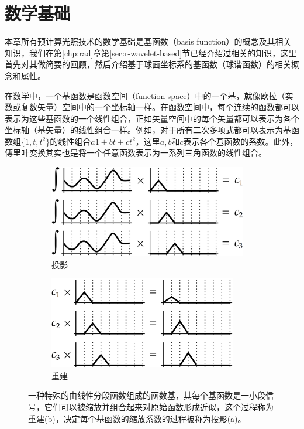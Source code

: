 \section{数学基础}\label{sec:pl-sh}
本章所有预计算光照技术的数学基础是基函数（basis function）的概念及其相关知识，我们在第\ref{chp:rad}章第\ref{sec:r-wavelet-based}节已经介绍过相关的知识，这里首先对其做简要的回顾，然后介绍基于球面坐标系的基函数（球谐函数）的相关概念和属性。

在数学中，一个基函数是函数空间（function space）中的一个基，就像欧拉（实数或复数矢量）空间中的一个坐标轴一样。在函数空间中，每个连续的函数都可以表示为这些基函数的一个线性组合，正如矢量空间中的每个矢量都可以表示为各个坐标轴（基矢量）的线性组合一样。例如，对于所有二次多项式都可以表示为基函数组$\{1,t,t^{2}\}$的线性组合$a1+bt+ct^{2}$，这里$a,b$和$c$表示各个基函数的系数。此外，傅里叶变换其实也是将一个任意函数表示为一系列三角函数的线性组合。

\begin{figure}
	\begin{subfigure}[b]{0.49\textwidth}
		\includegraphics[width=0.95\textwidth]{figures/prt/prt-1}
		\caption{投影}
	\end{subfigure}
		\begin{subfigure}[b]{0.49\textwidth}
		\includegraphics[width=0.9\textwidth]{figures/prt/prt-2}
			\caption{重建}
	\end{subfigure}
	\caption{一种特殊的由线性分段函数组成的函数基，其每个基函数是一小段信号，它们可以被缩放并组合起来对原始函数形成近似，这个过程称为重建(b)，决定每个基函数的缩放系数的过程被称为投影(a)。}
	\label{f:pl-projection-and-reconstruction}
\end{figure}

